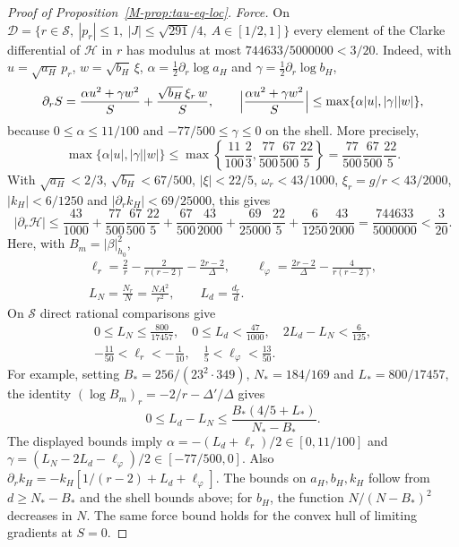 \documentclass[aip,jmp,amsmath,amssymb,reprint]{revtex4-2}
\theoremstyle{plain}
\theoremstyle{definition}
\begin{document}
\begin{proof}[Proof of Proposition~\ref{M-prop:tau-eq-loc}]
\emph{Force.} On $\mathcal D=\{r\in\mathcal S,\ |p_r|\le1,\ |J|\le\sqrt{291}/4,\ A\in[1/2,1]\}$ every element of the
Clarke differential of $\mathcal H$ in $r$ has modulus at most $744633/5000000<3/20$. Indeed, with
$u=\sqrt{a_H}\,p_r$, $w=\sqrt{b_H}\,\xi$, $\alpha=\frac12\partial_r\log a_H$ and $\gamma=\frac12\partial_r\log b_H$,
\[
  \partial_rS=\frac{\alpha u^2+\gamma w^2}{S}+\frac{\sqrt{b_H}\,\xi_r\,w}{S},\qquad
  \Bigl|\frac{\alpha u^2+\gamma w^2}{S}\Bigr|\le\max\{\alpha|u|,|\gamma||w|\},
\]
because $0\le\alpha\le11/100$ and $-77/500\le\gamma\le0$ on the shell. More precisely,
\[
 \max\{\alpha|u|,|\gamma||w|\}
 \le\max\left\{\frac{11}{100}\frac23,
                 \frac{77}{500}\frac{67}{500}\frac{22}{5}\right\}
 =\frac{77}{500}\frac{67}{500}\frac{22}{5}.
\]
With $\sqrt{a_H}<2/3$, $\sqrt{b_H}<67/500$, $|\xi|<22/5$,
$\omega_r<43/1000$, $\xi_r=g/r<43/2000$, $|k_H|<6/1250$ and
$|\partial_rk_H|<69/25000$, this gives
\[
 |\partial_r\mathcal H|
 \le\frac{43}{1000}
 +\frac{77}{500}\frac{67}{500}\frac{22}{5}
 +\frac{67}{500}\frac{43}{2000}
 +\frac{69}{25000}\frac{22}{5}
 +\frac6{1250}\frac{43}{2000}
 =\frac{744633}{5000000}<\frac3{20}.
\]
Here, with $B_m=|\beta|^2_{h_0}$,
\[
 \begin{array}{l}
 \displaystyle\ell_r=\frac2r-\frac2{r(r-2)}-\frac{2r-2}{\Delta},\qquad
 \ell_\varphi=\frac{2r-2}{\Delta}-\frac4{r(r-2)},\\[8pt]
 \displaystyle L_N=\frac{N_r}{N}=\frac{NA^2}{r^2},\qquad L_d=\frac{d_r}{d}.
 \end{array}
\]
On $\mathcal S$ direct rational comparisons give
\[
 \begin{array}{l}
 \displaystyle 0\le L_N\le\frac{800}{17457},\quad 0\le L_d<\frac{47}{1000},\quad
 2L_d-L_N<\frac6{125},\\[8pt]
 \displaystyle -\frac{11}{50}<\ell_r<-\frac1{10},\quad
 \frac15<\ell_\varphi<\frac{13}{50}.
 \end{array}
\]
For example, setting $B_*={256}/({23^2\cdot349})$,
$N_*=184/169$ and $L_*=800/17457$, the identity
$(\log B_m)_r=-2/r-\Delta'/\Delta$ gives
\[
 0\le L_d-L_N\le
 \frac{B_*(4/5+L_*)}{N_*-B_*}.
\]
The displayed bounds imply
$\alpha=-(L_d+\ell_r)/2\in[0,11/100]$ and
$\gamma=(L_N-2L_d-\ell_\varphi)/2\in[-77/500,0]$.
Also $\partial_rk_H=-k_H[1/(r-2)+L_d+\ell_\varphi]$.
The bounds on $a_H,b_H,k_H$ follow from $d\ge N_*-B_*$ and the shell bounds above;
for $b_H$, the function $N/(N-B_*)^2$ decreases in $N$.
The same force bound holds for the convex hull of limiting gradients at $S=0$.


\end{proof}
\end{document}
